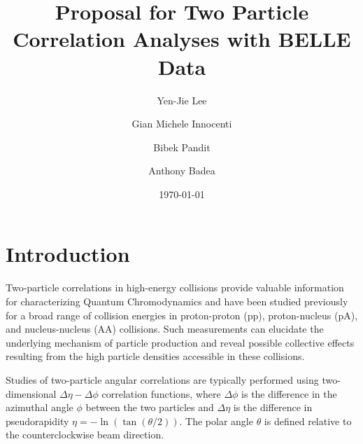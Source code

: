 \documentclass[%
preprint,
 amsmath,amssymb,
 aps,
]{revtex4-1}
\begin{document}

\title{Proposal for Two Particle Correlation Analyses with BELLE Data}%

\author{Yen-Jie Lee}
\author{Gian Michele Innocenti}%
\author{Bibek Pandit}%
\author{Anthony Badea}%


\date{\today}%

\begin{abstract}

\end{abstract}

\maketitle


\section{Introduction}

Two-particle correlations in high-energy collisions provide valuable information for characterizing Quantum Chromodynamics and have been studied previously for a broad range of collision energies in proton-proton (pp), proton-nucleus (pA), and nucleus-nucleus (AA) collisions. Such measurements can elucidate the underlying mechanism of particle production and reveal possible collective effects resulting from the high particle densities accessible in these collisions.

Studies of two-particle angular correlations are typically performed using two-dimensional $\Delta\eta-\Delta\phi$ correlation functions, where $\Delta\phi$ is the difference in the azimuthal angle $\phi$ between the two particles and $\Delta\eta$ is the difference in pseudorapidity $\eta = -\ln(\tan(\theta/2))$. The polar angle $\theta$ is defined relative to the counterclockwise beam direction.
\end{document}
